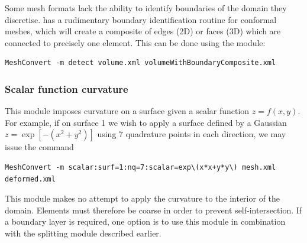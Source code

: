 Some mesh formats lack the ability to identify boundaries of the domain they
discretise. \mc has a rudimentary boundary identification routine for conformal
meshes, which will create a composite of edges (2D) or faces (3D) which are
connected to precisely one element. This can be done using the 
module:

\begin{lstlisting}[style=BashInputStyle]
  MeshConvert -m detect volume.xml volumeWithBoundaryComposite.xml
\end{lstlisting}

\subsubsection{Scalar function curvature}

This module imposes curvature on a surface given a scalar function
$z=f(x,y)$. For example, if on surface 1 we wish to apply a surface defined by a
Gaussian $z = \exp[-(x^2+y^2)]$ using 7 quadrature points in each direction, we
may issue the command

\begin{lstlisting}[style=BashInputStyle]
  MeshConvert -m scalar:surf=1:nq=7:scalar=exp\(x*x+y*y\) mesh.xml deformed.xml
\end{lstlisting}

\begin{notebox}
  This module makes no attempt to apply the curvature to the interior of the
  domain. Elements must therefore be coarse in order to prevent
  self-intersection. If a boundary layer is required, one option is to use this
  module in combination with the splitting module described earlier.
\end{notebox}

